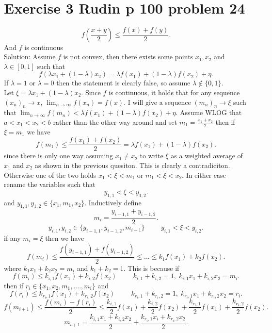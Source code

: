 \documentclass[11pt]{article}
\newcommand{\solution}[1]{{{\textcolor{header}{Solution:} \textcolor{solution}{#1}}}}
\begin{document}
\section{Exercise 3 Rudin p 100 problem 24}
\[
f(\frac{x+y}{2}) \le \frac{f(x) + f(y)}{2}
.\] 
And $f$ is continuous\\
\solution{
Assume $f$ is not convex, then there exists some points $x_1,x_2$ and $\lambda \in [0,1]$ such that
\[
f(\lambda x_1 + (1-\lambda)x_2) = \lambda f(x_1) + ( 1-\lambda)f(x_2) + \eta
.\] 
If $\lambda = 1$ or $\lambda = 0$ then the statement is clearly false, so assume $\lambda \not\in \{0,1\}$.\\
Let $\xi = \lambda x_1 + (1-\lambda)x_2$. Since $f$ is continuous, it holds that for any sequence $(x_n)_n \rightarrow x$, $\lim_{n\to \infty}f(x_n) = f(x)$. I will give
a sequence $(m_n)_n \rightarrow \xi$ such that $\lim_{n\to \infty} f(m_n) < \lambda f(x_1) + (1-\lambda)f(x_2) + \eta$. Assume WLOG that $a < x_1 < x_2 < b$ rather than the other way around
and set $m_1 = \frac{x_1 + x_2}{2}$ then if $\xi = m_1$ we have
\[
f(m_1) \le \frac{f(x_1) + f(x_2)}{2} = \lambda f(x_1) + (1-\lambda)f(x_2)
.\] 
since there is only one way assuming $x_1 \ne x_2$ to write $\xi$ as a weighted average of $x_1$ and $x_2$ as shown in the previous quesiton. This is clearly a contradiciton. 
Otherwise one of the two holds $x_1 < \xi  < m_1$ or $m_1 < \xi < x_2$. In either case rename the variables such that
\[
    y_{1,1} < \xi < y_{1,2}
.\] 
and $y_{1,1}, y_{1,2} \in \{x_1,m_1,x_2\}$.
Inductively define
\[
    m_{i} = \frac{y_{i-1,1} + y_{i-1,2}}{2}
.\] 
\[
    y_{i,1},y_{i,2} \in \{y_{i-1,1},y_{i-1,2},m_{i-1}\} \hspace{1cm} y_{i,1} < \xi < y_{i,2}
.\] 
if any $m_i = \xi$ then we have
 \[
     f(m_i) \le \frac{f(y_{i-1,1}) + f(y_{i-1,2})}{2} \le ... \le k_1 f(x_1) + k_2 f(x_2)
.\] 
where $k_1x_1 + k_2x_2 = m_i$ and $k_1 + k_2 = 1$. This is because if
\[
    f(m_i) \le k_{i,1}f(x_1) + k_{i,2}f(x_2) \hspace{1cm} k_{i,1} + k_{i,2} = 1, \; k_{i,1}x_1 + k_{i,2}x_2 = m_i
.\] 
then if $r_i \in \{x_1,x_2,m_1,....,m_i\}$ and
\[
    f(r_i) \le k_{r_i,1}f(x_1) + k_{r_i,2}f(x_2) \hspace{1cm} k_{r_i,1} + k_{r_i,2} = 1, \; k_{r_i,1}x_1 + k_{r_i,2}x_2 = r_i
.\] 
\[
    f(m_{i+1}) \le  \frac{f(m_i) + f(r_i)}{2} \le \frac{k_{i,1}}{2}f(x_1) + \frac{k_{i,2}}{2}f(x_2) + \frac{k_{r_i,1}}{2}f(x_1) + \frac{k_{r_i,2}}{2}f(x_2)
.\] 
\[
    m_{i+1} = \frac{k_{i,1}x_1 + k_{i,2}x_2}{2} + \frac{k_{r_i,1}x_i + k_{r_i,2}x_2}{2}
.\] 
}
\end{document}
